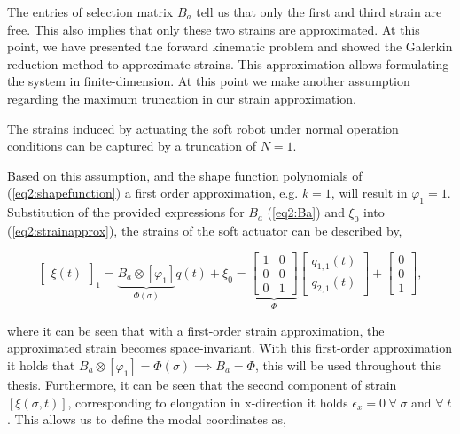 The entries of selection matrix $B_a$ tell us that only the first and third strain are free. This also implies that only these two strains are approximated. At this point, we have presented the forward kinematic problem and showed the Galerkin reduction method to approximate strains. This approximation allows formulating the system in finite-dimension. At this point we make another assumption regarding the maximum truncation in our strain approximation.

\begin{theorem}
The strains induced by actuating the soft robot under normal operation conditions can be captured by a truncation of $N = 1$. 
\end{theorem}

Based on this assumption, and the shape function polynomials of (\ref{eq2:shapefunction}) a first order approximation, e.g. $k=1$, will result in $\varphi_1 = 1$. Substitution of the provided expressions for $B_a$ (\ref{eq2:Ba}) and $\xi_0$ into (\ref{eq2:strainapprox}), the strains of the soft actuator can be described by,


\begin{equation}
    \begin{bmatrix}\xi(t)\end{bmatrix}_1 =\underbrace{B_a \otimes [\varphi_1]}_{\Phi(\sigma)} q(t) + \xi_0  =  \underbrace{\begin{bmatrix}
    1 & 0  \\
    0 & 0  \\
    0 & 1
    \end{bmatrix}}_{\Phi} \begin{bmatrix} q_{1,1}(t) \\  q_{2,1}(t) \end{bmatrix} +  \begin{bmatrix} 0 \\ 0 \\ 1   \end{bmatrix},
\label{eq2:xiapprox}
\end{equation}

where it can be seen that with a first-order strain approximation, the approximated strain becomes space-invariant. With this first-order approximation it holds that $B_a \otimes [\varphi_1] = \Phi(\sigma) \implies B_a = \Phi$, this will be used throughout this thesis. Furthermore, it can be seen that the second component of strain $[\xi(\sigma,t)]$, corresponding to elongation in x-direction it holds $\epsilon_x = 0 \hspace{3pt} \forall \hspace{3pt} \sigma $ and $ \forall \hspace{3pt} t$. This allows us to define the modal coordinates as,


